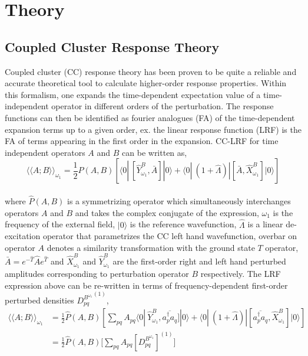 \section{Theory}
\subsection{Coupled Cluster Response Theory}
Coupled cluster (CC) response theory has been proven to be quite a reliable and accurate theoretical
tool to calculate higher-order response properties\cite{}. Within this formalism,
one expands the time-dependent expectation value of a time-independent operator 
in different orders of the perturbation. The response functions can then be identified 
as fourier analogues (FA) of the time-dependent expansion terms up to a given order, ex. the
linear response function (LRF) is the FA of terms appearing in the first order in the
expansion. CC-LRF for time independent operators $A$ and $B$ can be written as\cite{},
\\
\begin{equation}
{\langle\langle A;B\rangle\rangle}_{\omega_1} =  \frac{1}{2}\hat{P}(A,B)[\langle 0 | \
[\hat{Y}^{B}_{\omega_1}, \bar{A}]|0\rangle + \langle 0 | \
(1 + \hat{\Lambda})|[\bar{A},\hat{X}^{B}_{\omega_1}]|0\rangle]
\end{equation}
\\
where $\hat{P}(A,B)$ is a symmetrizing operator which simultaneously interchanges 
operators $A$ and $B$ and takes the complex conjugate of the expression, $\omega_1$ 
is the frequency of the external field, $|0\rangle$ is the reference wavefunction, $\hat{\Lambda}$ is
a linear de-excitation operator that parametrizes the CC left hand wavefunction, 
overbar on operator $A$ denotes a similarity transformation with the ground state 
$T$ operator, $\bar{A} = e^{-\hat{T}}\hat{A}e^{\hat{T}}$ and $\hat{X}^{B}_{\omega_1}$ 
and $\hat{Y}^{B}_{\omega_1}$ are the first-order right and left hand perturbed 
amplitudes corresponding to perturbation operator $B$ respectively.
The LRF expression above can be re-written in terms of frequency-dependent first-order 
perturbed densities ${D^{B^{\omega_1}}_{pq}}^{(1)}$, 
\\
\begin{equation}
\begin{split}
{\langle\langle A;B\rangle\rangle}_{\omega_1} & =  \frac{1}{2}\hat{P}(A,B)[\sum_{pq}A_{pq}\langle 0 | \
\hat{Y}^{B}_{\omega_1}, \overbar{a^{\dagger}_{p}a_q}]|0\rangle + \langle 0 | \
(1 + \hat{\Lambda})|[\overbar{a^{\dagger}_{p}a_q},\hat{X}^{B}_{\omega_1}]|0\rangle] \\
& = \frac{1}{2}\hat{P}(A,B) \big[\sum_{pq} A_{pq}[{D^{B^{\omega_1}}_{pq}}]^{(1)}\big]
\end{split}
\end{equation}
